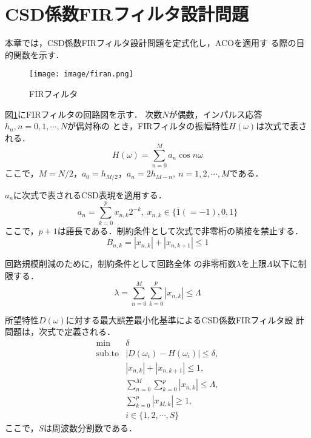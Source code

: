 \documentclass[dvipdfmx,9pt]{ieej}
\begin{document}
\section{CSD係数FIRフィルタ設計問題}
本章では，CSD係数FIRフィルタ設計問題を定式化し，ACOを適用す
る際の目的関数を示す．

\begin{figure}[ht]
 \begin{center}
  \texttt{[image: image/firan.png]}
 \end{center}
 \caption{FIRフィルタ}
\label{fig:fir}
\end{figure}

図\ref{fig:fir}にFIRフィルタの回路図を示す．
次数$N$が偶数，インパルス応答$h_{n}, n=0,1,\cdots,N$が偶対称の
とき，FIRフィルタの振幅特性$H(\omega)$は次式で表される．
\begin{equation}
 H(\omega) = \sum_{n=0}^{M} a_{n}\cos n\omega
\end{equation}
ここで，$M=N/2$，$a_{0}=h_{M/2}$，$a_{n}=2h_{M-n}, \
n=1,2,\cdots,M$である．

$a_{n}$に次式で表されるCSD表現を適用する．
\begin{equation}
 a_{n}=\sum_{k=0}^{p}x_{n, k}2^{-k}, \ x_{n, k}\in\{\overline{1}(=-1),0,1\}
\end{equation}
ここで，$p+1$は語長である．制約条件として次式で非零桁の隣接を禁止する．
\begin{equation}
 B_{n,k}=|x_{n,k}|+|x_{n,k+1}| \leq 1
\label{eqn:neibor}
\end{equation}

回路規模削減のために，制約条件として回路全体
の非零桁数$\lambda$を上限$\Lambda$以下に制限する．
\begin{equation}
 \lambda = \sum_{n=0}^{M}\sum_{k=0}^{p} |x_{n,k}| \leq \Lambda
\label{eqn:totalbits}
\end{equation}

所望特性$D(\omega)$に対する最大誤差最小化基準によるCSD係数FIRフィルタ設
計問題は，次式で定義される．
\begin{equation}
\begin{array}{rl}
 \min & \delta \\
\mbox{sub.to} & |D(\omega_{i})-H(\omega_{i})|\leq \delta, \\
& |x_{n,k}|+|x_{n,k+1}|\leq 1, \\
&
 \displaystyle{\sum_{n=0}^{M}}\displaystyle{\sum_{k=0}^{p}}|x_{n,k}|\leq
 \Lambda, \\
&   \displaystyle{ \sum_{k=0}^{p} |x_{M,k}| } \geq 1,\\
& i\in\{1,2,\cdots,S\}
\end{array}
\label{eqn:mondai_def}
\end{equation}
ここで，$S$は周波数分割数である．
\end{document}
